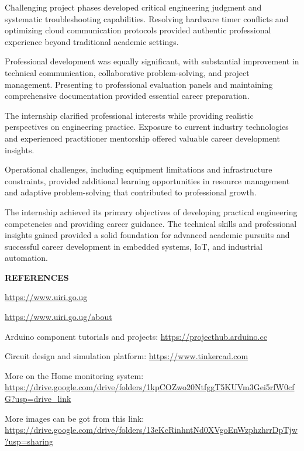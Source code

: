 \documentclass[12pt,a4paper]{report}
\begin{document}
\noindent Challenging project phases developed critical engineering judgment and systematic troubleshooting capabilities. Resolving hardware timer conflicts and optimizing cloud communication protocols provided authentic professional experience beyond traditional academic settings.

\noindent Professional development was equally significant, with substantial improvement in technical communication, collaborative problem-solving, and project management. Presenting to professional evaluation panels and maintaining comprehensive documentation provided essential career preparation.

\noindent The internship clarified professional interests while providing realistic perspectives on engineering practice. Exposure to current industry technologies and experienced practitioner mentorship offered valuable career development insights.

\noindent Operational challenges, including equipment limitations and infrastructure constraints, provided additional learning opportunities in resource management and adaptive problem-solving that contributed to professional growth.

\noindent The internship achieved its primary objectives of developing practical engineering competencies and providing career guidance. The technical skills and professional insights gained provided a solid foundation for advanced academic pursuits and successful career development in embedded systems, IoT, and industrial automation.

\newpage
{\fontsize{14}{16.8}\selectfont\bfseries\centering REFERENCES\par}
\vspace{10pt}

\noindent \url{https://www.uiri.go.ug}

\noindent \url{https://www.uiri.go.ug/about}

\noindent Arduino component tutorials and projects: 
\url{https://projecthub.arduino.cc}

\noindent Circuit design and simulation platform: 
\url{https://www.tinkercad.com}

\noindent More on the Home monitoring system: \\
\url{https://drive.google.com/drive/folders/1kpCOZwo20NtfggT5KUVm3Gei5rfW0cfG?usp=drive_link}

\noindent More images can be got from this link: \\
\url{https://drive.google.com/drive/folders/13eKcRinhntNd0XVgoEnWzphzhrrDpTjw?usp=sharing}
\end{document}
